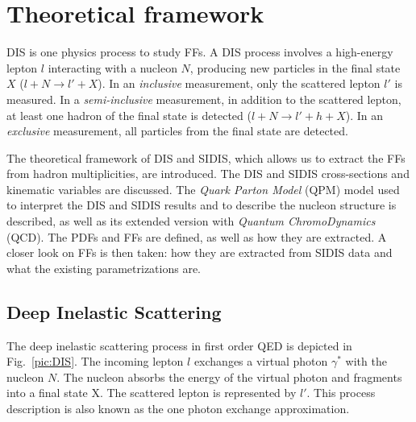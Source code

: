 
\chapter{Theoretical framework} %

\label{ch:thfw} %


DIS is one physics process to study FFs. A DIS process involves a high-energy lepton $l$ interacting with a nucleon $N$, producing new particles in the final state $X$ ($l+N \rightarrow l'+X$). In an \textit{inclusive} measurement, only the scattered lepton $l'$ is measured. In a \textit{semi-inclusive} measurement, in addition to the scattered lepton, at least one hadron of the final state is detected ($l+N \rightarrow l'+h+X$). In an \textit{exclusive} measurement, all particles from the final state are detected.

The theoretical framework of DIS and SIDIS, which allows us to extract the FFs from hadron multiplicities, are introduced. The DIS and SIDIS cross-sections and kinematic variables are discussed. The \textit{Quark Parton Model} (QPM) model used to interpret the DIS and SIDIS results and to describe the nucleon structure is described, as well as its extended version with \textit{Quantum ChromoDynamics} (QCD). The PDFs and FFs are defined, as well as how they are extracted. A closer look on FFs is then taken: how they are extracted from SIDIS data and what the existing parametrizations are.

\section{Deep Inelastic Scattering}

The deep inelastic scattering process in first order QED is depicted in Fig.~\ref{pic:DIS}. The incoming lepton $l$ exchanges a virtual photon $\gamma^*$ with the nucleon $N$. The nucleon absorbs the energy of the virtual photon and fragments into a final state X. The scattered lepton is represented by $l'$. This process description is also known as the one photon exchange approximation.

